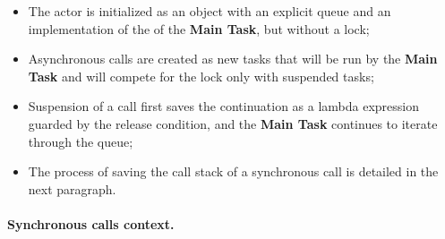 \begin{itemize}
	\item The actor is initialized as an object with an explicit queue and an implementation of the of the \textbf{Main Task}, but without a lock;
	\item Asynchronous calls are created as new tasks that will be run by the \textbf{Main Task} and will compete for the lock only with suspended tasks;
	\item Suspension of a call first saves the continuation as a lambda expression guarded by the release condition, and the \textbf{Main Task} continues to iterate through the queue;
	\item The process of saving the call stack of a synchronous call is detailed in the next paragraph.
\end{itemize}



 

\paragraph{Synchronous calls context.}

